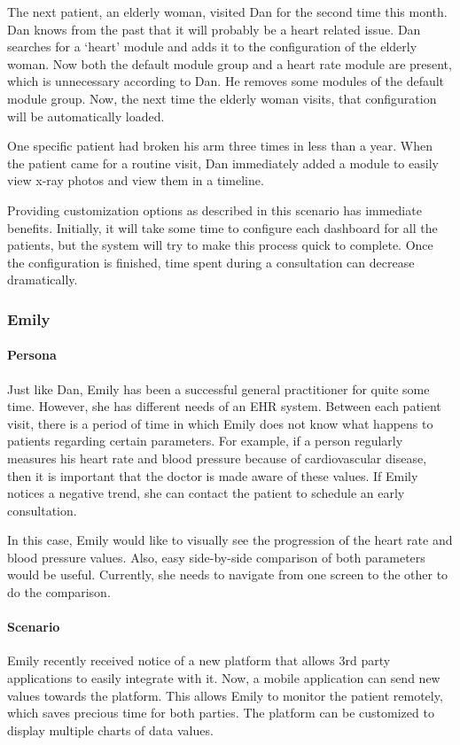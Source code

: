         The next patient, an elderly woman, visited Dan for the second time this month. Dan knows from the past that it will probably be a heart related issue. Dan searches for a `heart' module and adds it to the configuration of the elderly woman. Now both the default module group and a heart rate module are present, which is unnecessary according to Dan. He removes some modules of the default module group. Now, the next time the elderly woman visits, that configuration will be automatically loaded.

        One specific patient had broken his arm three times in less than a year. When the patient came for a routine visit, Dan immediately added a module to easily view x-ray photos and view them in a timeline.\bigskip

        \noindent Providing customization options as described in this scenario has immediate benefits. Initially, it will take some time to configure each dashboard for all the patients, but the system will try to make this process quick to complete. Once the configuration is finished, time spent during a consultation can decrease dramatically.
        
        \subsubsection{Emily}

        \paragraph{Persona} Just like Dan, Emily has been a successful general practitioner for quite some time. However, she has different needs of an EHR system. Between each patient visit, there is a period of time in which Emily does not know what happens to patients regarding certain parameters. For example, if a person regularly measures his heart rate and blood pressure because of cardiovascular disease, then it is important that the doctor is made aware of these values. If Emily notices a negative trend, she can contact the patient to schedule an early consultation.
        
        In this case, Emily would like to visually see the progression of the heart rate and blood pressure values. Also, easy side-by-side comparison of both parameters would be useful. Currently, she needs to navigate from one screen to the other to do the comparison.
        
        \paragraph{Scenario} Emily recently received notice of a new platform that allows 3rd party applications to easily integrate with it. Now, a mobile application can send new values towards the platform. This allows Emily to monitor the patient remotely, which saves precious time for both parties. The platform can be customized to display multiple charts of data values.

